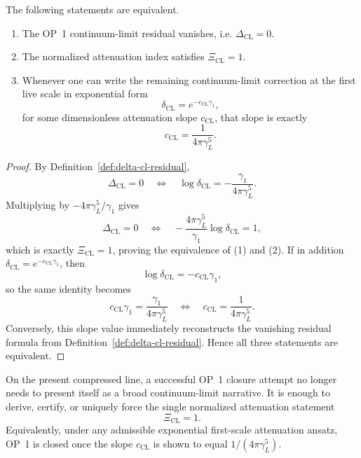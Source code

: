 \begin{proposition}
\label{prop:op1-slope-certificate}
The following statements are equivalent.
\begin{enumerate}[leftmargin=2em]
 \item The OP~1 continuum-limit residual vanishes, i.e. \(\Delta_{\mathrm{CL}}=0\).
 \item The normalized attenuation index satisfies \(\Xi_{\mathrm{CL}}=1\).
 \item Whenever one can write the remaining continuum-limit correction at the first live scale in exponential form
 \[
 \delta_{\mathrm{CL}} = e^{-c_{\mathrm{CL}}\gamma_1},
 \]
 for some dimensionless attenuation slope \(c_{\mathrm{CL}}\), that slope is exactly
 \[
 c_{\mathrm{CL}} = \frac{1}{4\pi\gamma_L^5}.
 \]
\end{enumerate}
\end{proposition}

\begin{proof}
By Definition~\ref{def:delta-cl-residual},
\[
 \Delta_{\mathrm{CL}}=0
 \quad\Longleftrightarrow\quad
 \log \delta_{\mathrm{CL}} = -\frac{\gamma_1}{4\pi\gamma_L^5}.
\]
Multiplying by \(-4\pi\gamma_L^5/\gamma_1\) gives
\[
 \Delta_{\mathrm{CL}}=0
 \quad\Longleftrightarrow\quad
 -\frac{4\pi\gamma_L^5}{\gamma_1}\log \delta_{\mathrm{CL}} = 1,
\]
which is exactly \(\Xi_{\mathrm{CL}}=1\), proving the equivalence of (1) and (2). If in addition \(\delta_{\mathrm{CL}} = e^{-c_{\mathrm{CL}}\gamma_1}\), then
\[
 \log \delta_{\mathrm{CL}} = -c_{\mathrm{CL}}\gamma_1,
\]
so the same identity becomes
\[
 c_{\mathrm{CL}}\gamma_1 = \frac{\gamma_1}{4\pi\gamma_L^5}
 \quad\Longleftrightarrow\quad
 c_{\mathrm{CL}} = \frac{1}{4\pi\gamma_L^5}.
\]
Conversely, this slope value immediately reconstructs the vanishing residual formula from Definition~\ref{def:delta-cl-residual}. Hence all three statements are equivalent.
\end{proof}

\begin{corollary}
\label{cor:op1-r02-target}
On the present compressed line, a successful OP~1 closure attempt no longer needs to present itself as a broad continuum-limit narrative. It is enough to derive, certify, or uniquely force the single normalized attenuation statement
\[
 \Xi_{\mathrm{CL}}=1.
\]
Equivalently, under any admissible exponential first-scale attenuation ansatz, OP~1 is closed once the slope \(c_{\mathrm{CL}}\) is shown to equal \(1/(4\pi\gamma_L^5)\).
\end{corollary}

